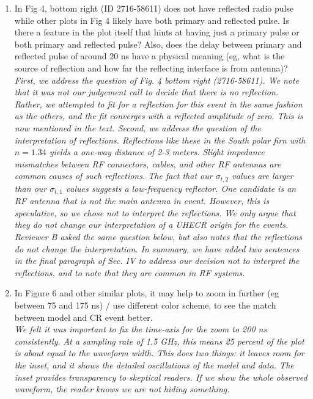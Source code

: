 \documentclass[amsmath,amssymb,aps,prd,10pt,twocolumn,showkeys]{revtex4}
\begin{document}
\begin{enumerate}
\item In Fig 4, bottom right (ID 2716-58611) does not have reflected radio pulse while other plots in Fig 4 likely have both primary and reflected pulse. Is there a feature in the plot itself that hints at having just a primary pulse or both primary and reflected pulse? Also, does the delay between primary and reflected pulse of around 20 ns have a physical meaning (eg, what is the source of reflection and how far the reflecting interface is from antenna)? \\

\textit{First, we address the question of Fig. 4 bottom right (2716-58611).  We note that it was not our judgement call to decide that there is no reflection.  Rather, we attempted to fit for a reflection for this event in the same fashion as the others, and the fit converges with a reflected amplitude of zero.  This is now mentioned in the text.  Second, we address the question of the interpretation of reflections.  Reflections like these in the South polar firn with $n=1.34$ yields a one-way distance of 2-3 meters.  Slight impedance mismatches between RF connectors, cables, and other RF antennas are common causes of such reflections.  The fact that our $\sigma_{t,2}$ values are larger than our $\sigma_{t,1}$ values suggests a low-frequency reflector.  One candidate is an RF antenna that is not the main antenna in event.  However, this is speculative, so we chose not to interpret the reflections.  We only argue that they do not change our interpretation of a UHECR origin for the events.  Reviewer B asked the same question below, but also notes that the reflections do not change the interpretation.  In summary, we have added two sentences in the final paragraph of Sec. IV to address our decision not to interpret the reflections, and to note that they are common in RF systems.}

\item In Figure 6 and other similar plots, it may help to zoom in further (eg between 75 and 175 ns) / use different color scheme, to see the match between model and CR event better. \\ 

\textit{We felt it was important to fix the time-axis for the zoom to 200 ns consistently.  At a sampling rate of 1.5 GHz, this means 25 percent of the plot is about equal to the waveform width.  This does two things: it leaves room for the inset, and it shows the detailed oscillations of the model and data.  The inset provides transparency to skeptical readers.  If we show the whole observed waveform, the reader knows we are not hiding something.}


\end{enumerate}
\end{document}

